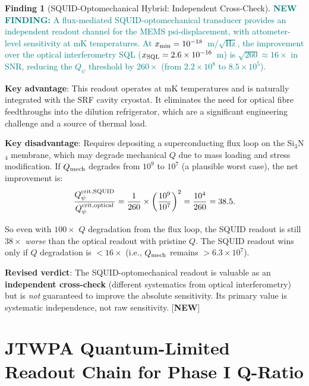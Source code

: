 \documentclass[11pt]{article}
\newcommand{\ee}[1]{\times 10^{#1}}
\newcommand{\Qpsi}{Q_\psi}
\newcommand{\newfinding}[1]{\textcolor{teal}{\textbf{NEW FINDING:} #1}}
\theoremstyle{definition}
\newtheorem{finding}[theorem]{Finding}
\theoremstyle{remark}
\begin{document}
\begin{finding}[SQUID-Optomechanical Hybrid: Independent Cross-Check]
\label{find:SQUID}
\newfinding{A flux-mediated SQUID-optomechanical transducer provides
an independent readout channel for the MEMS psi-displacement, with
attometer-level sensitivity at mK temperatures. At $x_{\rm min} =
10^{-18}$~m/$\sqrt{\text{Hz}}$, the improvement over the optical
interferometry SQL ($x_{\rm SQL} = 2.6\ee{-16}$~m) is $\sqrt{260}
\approx 16\times$ in SNR, reducing the $\Qpsi$ threshold by
$260\times$ (from $2.2\ee{8}$ to $8.5\ee{5}$).}

\textbf{Key advantage}: This readout operates at mK temperatures
and is naturally integrated with the SRF cavity cryostat. It
eliminates the need for optical fibre feedthroughs into the
dilution refrigerator, which are a significant engineering challenge
and a source of thermal load.

\textbf{Key disadvantage}: Requires depositing a superconducting
flux loop on the Si$_3$N$_4$ membrane, which may degrade mechanical
$Q$ due to mass loading and stress modification. If $Q_{\rm mech}$
degrades from $10^9$ to $10^7$ (a plausible worst case), the net
improvement is:
\begin{equation}
\frac{\Qpsi^{\rm crit, SQUID}}{\Qpsi^{\rm crit, optical}}
= \frac{1}{260}\times\left(\frac{10^9}{10^7}\right)^2
= \frac{10^4}{260} = 38.5.
\end{equation}

So even with $100\times$ $Q$ degradation from the flux loop,
the SQUID readout is still $38\times$ \emph{worse} than the
optical readout with pristine $Q$. The SQUID readout wins only
if $Q$ degradation is $< 16\times$ (i.e., $Q_{\rm mech}$ remains
$> 6.3\ee{7}$).

\textbf{Revised verdict}: The SQUID-optomechanical readout is
valuable as an \textbf{independent cross-check} (different
systematics from optical interferometry) but is \emph{not}
guaranteed to improve the absolute sensitivity. Its primary
value is systematic independence, not raw sensitivity.
[\textbf{NEW}]
\end{finding}


\part{JTWPA Quantum-Limited Readout Chain for Phase I Q-Ratio}
\label{part:JTWPA}
\end{document}
